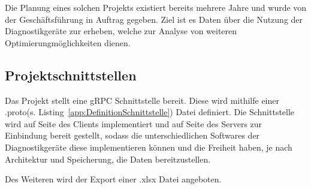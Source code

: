 Die Planung eines solchen Projekts existiert bereits mehrere Jahre und wurde von der Geschäftsführung in Auftrag gegeben. Ziel ist es Daten über die Nutzung der {\betriebNameKzf} Diagnostikgeräte zur erheben, welche zur Analyse von weiteren Optimierungmöglichkeiten dienen.

\subsection{Projektschnittstellen}
\label{sec:Projektschnittstellen}
Das Projekt stellt eine {\acs{gRPC}} Schnittstelle bereit. Diese wird mithilfe einer \glqq .proto\grqq \xspace (s. Listing~\ref{app:DefinitionSchnittstelle}) Datei definiert. Die Schnittstelle wird auf Seite des Clients implementiert und auf Seite des Servers zur Einbindung bereit gestellt, sodass die unterschiedlichen Softwares der Diagnostikgeräte diese implementieren können und die Freiheit haben, je nach Architektur und Speicherung, die Daten bereitzustellen.

Des Weiteren wird der Export einer \glqq .xlsx\grqq \xspace Datei angeboten.
